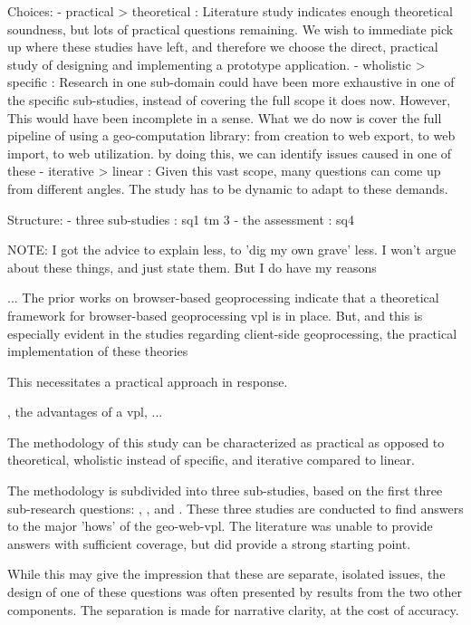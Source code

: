 \begin{note}
Choices: 
- practical > theoretical : Literature study indicates enough theoretical soundness, but lots of practical questions remaining. We wish to  immediate pick up where these studies have left, and therefore we choose the direct, practical study of designing and implementing a prototype application. 
- wholistic > specific    : Research in one sub-domain could have been more exhaustive in one of the specific sub-studies, instead of covering the full scope it does now. However, This would have been incomplete in a sense. What we do now is cover the full pipeline of using a geo-computation library: from creation to web export, to web import, to web utilization. by doing this, we can identify issues caused in one of these
- iterative > linear      : Given this vast scope, many questions can come up from different angles. The study has to be dynamic to adapt to these demands. 

Structure: 
- three sub-studies : sq1 tm 3
- the assessment : sq4

NOTE: I got the advice to explain less, to 'dig my own grave' less. I won't argue about these things, and just state them. But I do have my reasons

...
The prior works on browser-based geoprocessing indicate that a theoretical framework for browser-based geoprocessing vpl is in place. 
But, and this is especially evident in the studies regarding client-side geoprocessing, the practical implementation of these theories

This necessitates a practical approach in response. 

, the advantages of a vpl, 
...
\end{note}

The methodology of this study can be characterized as practical as opposed to theoretical, wholistic instead of specific, and iterative compared to linear.
 
The methodology is subdivided into three sub-studies, based on the first three sub-research questions: , , and .  
These three studies are conducted to find answers to the major 'hows' of the geo-web-vpl. 
The literature was unable to provide answers with sufficient coverage, but did provide a strong starting point. 

While this may give the impression that these are separate, isolated issues, the design of one of these  questions was often presented by results from the two other components. 
The separation is made for narrative clarity, at the cost of accuracy. 

